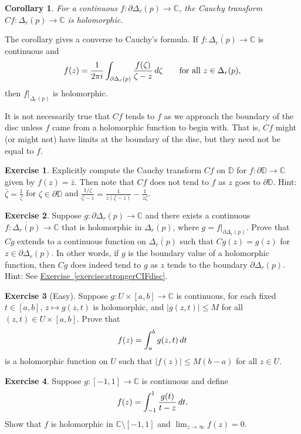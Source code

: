 \documentclass[12pt,openany]{book}
\newcommand{\avoidbreak}{\postdisplaypenalty=100}
\newcommand{\sabs}[1]{\lvert {#1} \rvert}
\newcommand{\C}{{\mathbb{C}}}
\newcommand{\D}{{\mathbb{D}}}
\theoremstyle{plain}
\newtheorem{cor}[thm]{Corollary}
\theoremstyle{remark}
\theoremstyle{definition}
\newenvironment{exbox}{%
    \def\FrameCommand{\vrule width 1pt \relax\hspace{10pt}}%
    \MakeFramed{\advance\hsize-\width\FrameRestore}%
}{%
    \endMakeFramed
}
\theoremstyle{exercise}
\newtheorem{exercise}{Exercise}[section]
\theoremstyle{example}
\newcommand{\exerciseref}[1]{\hyperref[#1]{Exercise~\ref*{#1}}}
\begin{document}
\begin{cor}
For a continuous $f \colon \partial \Delta_r(p) \to \C$,
the Cauchy transform $Cf \colon \Delta_r(p) \to \C$ is holomorphic.
\end{cor}

The corollary gives a converse to Cauchy's formula.
If $f \colon \overline{\Delta_r(p)} \to \C$ is continuous and
\begin{equation*}
f(z) =
\frac{1}{2\pi i}
\int_{\partial \Delta_r(p)} \frac{f(\zeta)}{\zeta-z} \, d\zeta
\qquad \text{for all } z \in \Delta_r(p),
\avoidbreak
\end{equation*}
then $f|_{\Delta_r(p)}$ is holomorphic.

It is not necessarily true that $Cf$ tends to $f$ as we approach the
boundary of the disc unless $f$ came from 
a holomorphic function to begin with.  That is, $Cf$ might (or might not) have limits at
the boundary of the disc, but they need not be equal to $f$.


\begin{exbox}
\begin{exercise}
Explicitly compute
the Cauchy transform $Cf$ on $\D$ for $f \colon \partial \D \to \C$
given by $f(z) = \bar{z}$.  Then note that $Cf$ does not tend to $f$
as $z$ goes to $\partial \D$.
Hint: $\bar{\zeta} = \frac{1}{\zeta}$ for
$\zeta \in \partial \D$
and $\frac{1/\zeta}{\zeta-z} = \frac{1}{z(\zeta-z)} - \frac{1}{z \zeta}$.
\end{exercise}

\begin{exercise}
Suppose $g \colon \partial \Delta_r(p) \to \C$ and
there exists a continuous
$f \colon \overline{\Delta_r(p)} \to \C$ that is
holomorphic in $\Delta_r(p)$, where $g = f|_{\partial \Delta_r(p)}$.
Prove that $Cg$ extends to a
continuous function on $\overline{\Delta_r(p)}$ such that
$Cg(z) = g(z)$ for $z \in \partial \Delta_r(p)$.
In other words, if $g$ is
the boundary value of a holomorphic function, then $Cg$ does indeed tend to
$g$ as $z$ tends to the boundary $\partial \Delta_r(p)$.
Hint: See \exerciseref{exercise:strongerCIFdisc}.
\end{exercise}

\begin{exercise}[Easy]
Suppose $g \colon U \times [a,b] \to \C$ is continuous, 
for each fixed $t \in [a,b]$, $z\mapsto g(z,t)$ is holomorphic,
and $\sabs{g(z,t)} \leq M$ for all $(z,t) \in U \times
[a,b]$.  Prove that
\begin{equation*}
f(z) = \int_a^b g(z,t)  \, dt
\avoidbreak
\end{equation*}
is a holomorphic function on $U$
such that $\sabs{f(z)} \leq M(b-a)$ for all $z \in U$.
\end{exercise}

\begin{exercise}
Suppose $g \colon [-1,1] \to \C$ is continuous and define
\begin{equation*}
f(z) = \int_{-1}^1 \frac{g(t)}{t-z} \, dt .
\avoidbreak
\end{equation*}
Show that $f$ is holomorphic in $\C \setminus [-1,1]$ and
$\lim_{z \to \infty} f(z) = 0$.
\end{exercise}
\end{exbox}
\end{document}
